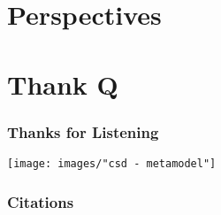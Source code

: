 


\section{Perspectives}
\begin{frame}
  \centering
  \hspace{-1cm}
  \huge
\end{frame}

\section*{Thank Q}
\begin{frame}
  \frametitle{Thanks for Listening}
  \hspace*{-2cm}
  \texttt{[image: images/"csd - metamodel"]}
\end{frame}

\begin{frame}[shrink=50]
  \frametitle{Citations}
  \printbibliography
  

\end{frame}